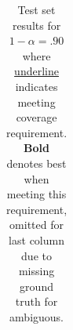 \begin{table}[h!]
{\begin{tabular}{lccr|cccc}
\bottomrule
\end{tabular}}
    \caption{Test set results for $1-\alpha=.90$ where \underline{underline} indicates meeting coverage requirement. \textbf{Bold} denotes best when meeting this requirement, omitted for last column due to missing ground truth for ambiguous.}
    \label{tab:results_unoptimized}
\end{table}